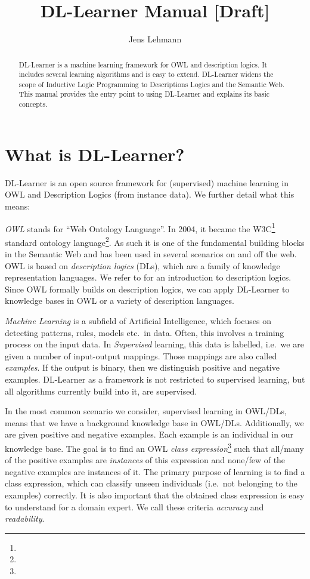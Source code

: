 \documentclass[a4paper,12pt]{scrartcl}
\title{DL-Learner Manual [Draft]}
\author{Jens Lehmann}
\begin{document}
\maketitle

\begin{abstract}
DL-Learner is a machine learning framework for OWL and description logics. It includes several learning algorithms and is easy to extend. DL-Learner widens the scope of Inductive Logic Programming to Descriptions Logics and the Semantic Web. This manual provides the entry point to using DL-Learner and explains its basic concepts.
\end{abstract}

\tableofcontents

\clearpage

\section{What is DL-Learner?}

DL-Learner is an open source framework for (supervised) machine learning in OWL and Description Logics (from instance data). We further detail what this means:

\emph{OWL} stands for ``Web Ontology Language''. In 2004, it became the W3C\footnote{\wwwc} standard ontology language\footnote{\owl}. As such it is one of the fundamental building blocks in the Semantic Web and has been used in several scenarios on and off the web. OWL is based on \emph{description logics} (DLs), which are a family of knowledge representation languages. We refer to \cite{dlhb} for an introduction to description logics. Since OWL formally builds on description logics, we can apply DL-Learner to knowledge bases in OWL or a variety of description languages.

\emph{Machine Learning} is a subfield of Artificial Intelligence, which focuses on detecting patterns, rules, models etc.~in data. Often, this involves a training process on the input data. In \emph{Supervised} learning, this data is labelled, i.e.~we are given a number of input-output mappings. Those mappings are also called \emph{examples}. If the output is binary, then we distinguish positive and negative examples. DL-Learner as a framework is not restricted to supervised learning, but all algorithms currently build into it, are supervised.

In the most common scenario we consider, supervised learning in OWL/DLs, means that we have a background knowledge base in OWL/DLs. Additionally, we are given positive and negative examples. Each example is an individual in our knowledge base. The goal is to find an OWL \emph{class expression}\footnote{\owlce} such that all/many of the positive examples are \emph{instances} of this expression and none/few of the negative examples are instances of it. The primary purpose of learning is to find a class expression, which can classify unseen individuals (i.e.~not belonging to the examples) correctly. It is also important that the obtained class expression is easy to understand for a domain expert. We call these criteria \emph{accuracy} and \emph{readability}.
\end{document}
